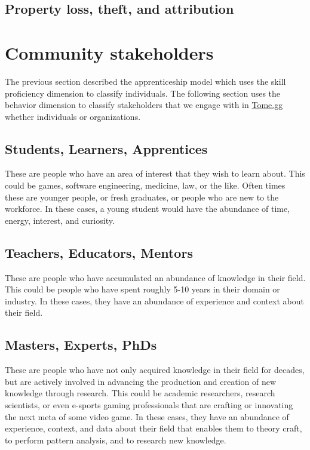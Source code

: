 \documentclass[conference]{IEEEtran}
\newcommand{\tomegg}{
  \href{http://tome.gg}{Tome.gg}
}
\begin{document}
\subsection{Property loss, theft, and attribution}

\section{Community stakeholders}
\label{sec:stakeholders}

The previous section described the apprenticeship model which uses the 
skill proficiency dimension to classify individuals.
The following section uses the behavior dimension to classify stakeholders
that we engage with in \tomegg whether individuals or organizations.

\subsection{Students, Learners, Apprentices}

These are people who have an area of interest that they wish to learn
about. This could be games, software engineering, medicine, law, or the like.
Often times these are younger people, or fresh graduates, or people who are
new to the workforce. In these cases, a young student would have the abundance of 
time, energy, interest, and curiosity.

\subsection{Teachers, Educators, Mentors}

These are people who have accumulated an abundance of knowledge in their field.
This could be people who have spent roughly 5-10 years in their domain or industry.
In these cases, they have an abundance of experience and context about their
field.

\subsection{Masters, Experts, PhDs}

These are people who have not only acquired knowledge in their field for decades,
but are actively involved in advancing the production and creation of new 
knowledge through research. This could be academic researchers, research scientists,
or even e-sports gaming professionals that are crafting or innovating the next meta of 
some video game. In these cases, they have an abundance of experience, context, and
data about their field that enables them to theory craft, to perform pattern analysis,
and to research new knowledge.
\end{document}
